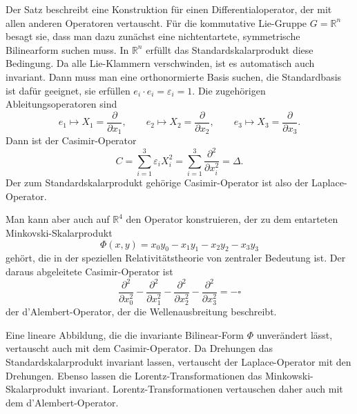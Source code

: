 Der Satz beschreibt eine Konstruktion für einen Differentialoperator,
der mit allen anderen Operatoren vertauscht.
Für die kommutative Lie-Gruppe $G=\mathbb{R}^n$ besagt sie, dass man
dazu zunächst eine nichtentartete, symmetrische Bilinearform suchen muss.
In $\mathbb{R}^n$ erfüllt das Standardskalarprodukt diese Bedingung.
Da alle Lie-Klammern verschwinden, ist es automatisch auch invariant.
Dann muss man eine orthonormierte Basis suchen, die Standardbasis
ist dafür geeignet, sie erfüllen $e_i\cdot e_i=\varepsilon_i=1$.
Die zugehörigen Ableitungsoperatoren sind
\[
e_1 \mapsto X_1 = \frac{\partial}{\partial x_1},
\qquad
e_2 \mapsto X_2 = \frac{\partial}{\partial x_2},
\qquad
e_3 \mapsto X_3 = \frac{\partial}{\partial x_3}.
\]
Dann ist der Casimir-Operator
\[
C=
\sum_{i=1}^3 \varepsilon_i X_i^2
=
\sum_{i=1}^3 \frac{\partial^2}{\partial x_i^2}
=
\Delta.
\]
Der zum Standardskalarprodukt gehörige Casimir-Operator ist also
der Laplace-Operator.

Man kann aber auch auf $\mathbb{R}^4$ den Operator konstruieren, der
zu dem entarteten Minkovski-Skalarprodukt
\[
\Phi(x,y)
=
x_0y_0
-
x_1y_1
-
x_2y_2
-
x_3y_3
\]
gehört, die in der speziellen Relativitätstheorie von zentraler Bedeutung
ist.
Der daraus abgeleitete Casimir-Operator ist
\[
\frac{\partial^2}{\partial x_0^2}
-
\frac{\partial^2}{\partial x_1^2}
-
\frac{\partial^2}{\partial x_2^2}
-
\frac{\partial^2}{\partial x_3^2}
=
-\square
\]
der d'Alembert-Operator, der die Wellenausbreitung beschreibt.

Eine lineare Abbildung, die die invariante Bilinear-Form $\Phi$ unverändert
lässt, vertauscht auch mit dem Casimir-Operator.
Da Drehungen das Standardskalarprodukt invariant lassen, vertauscht
der Laplace-Operator mit den Drehungen.
Ebenso lassen die Lorentz-Transformationen das Minkowski-Skalarprodukt
invariant.
Lorentz-Transformationen vertauschen daher auch mit dem d'Alembert-Operator.

